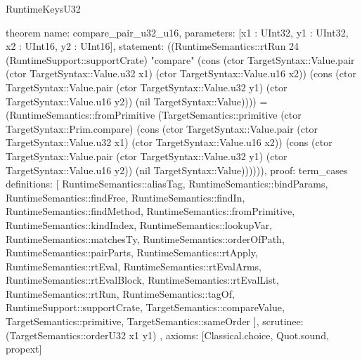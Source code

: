 \begin{lexlean}{RuntimeKeysU32}
\begin{semanticmodule}
theorem{
  name: compare_pair_u32_u16,
  parameters: [x1 : UInt32, y1 : UInt32, x2 : UInt16, y2 : UInt16],
  statement: ((RuntimeSemantics::rtRun 24 (RuntimeSupport::supportCrate) "compare" (cons (ctor TargetSyntax::Value.pair (ctor TargetSyntax::Value.u32 x1) (ctor TargetSyntax::Value.u16 x2)) (cons (ctor TargetSyntax::Value.pair (ctor TargetSyntax::Value.u32 y1) (ctor TargetSyntax::Value.u16 y2)) (nil TargetSyntax::Value)))) = (RuntimeSemantics::fromPrimitive (TargetSemantics::primitive (ctor TargetSyntax::Prim.compare) (cons (ctor TargetSyntax::Value.pair (ctor TargetSyntax::Value.u32 x1) (ctor TargetSyntax::Value.u16 x2)) (cons (ctor TargetSyntax::Value.pair (ctor TargetSyntax::Value.u32 y1) (ctor TargetSyntax::Value.u16 y2)) (nil TargetSyntax::Value)))))),
  proof: term_cases{
    definitions: [
      RuntimeSemantics::aliasTag,
      RuntimeSemantics::bindParams,
      RuntimeSemantics::findFree,
      RuntimeSemantics::findIn,
      RuntimeSemantics::findMethod,
      RuntimeSemantics::fromPrimitive,
      RuntimeSemantics::kindIndex,
      RuntimeSemantics::lookupVar,
      RuntimeSemantics::matchesTy,
      RuntimeSemantics::orderOfPath,
      RuntimeSemantics::pairParts,
      RuntimeSemantics::rtApply,
      RuntimeSemantics::rtEval,
      RuntimeSemantics::rtEvalArms,
      RuntimeSemantics::rtEvalBlock,
      RuntimeSemantics::rtEvalList,
      RuntimeSemantics::rtRun,
      RuntimeSemantics::tagOf,
      RuntimeSupport::supportCrate,
      TargetSemantics::compareValue,
      TargetSemantics::primitive,
      TargetSemantics::sameOrder
    ],
    scrutinee: (TargetSemantics::orderU32 x1 y1)
  },
  axioms: [Classical.choice, Quot.sound, propext]
}


\end{semanticmodule}
\end{lexlean}
